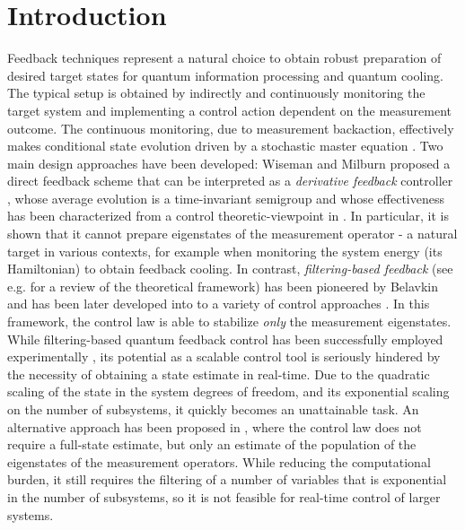 \documentclass[conference]{IEEEtran}
\theoremstyle{plain}
\theoremstyle{plain}
\theoremstyle{plain}
\theoremstyle{plain}
\theoremstyle{remark}
\theoremstyle{definition}
\begin{document}
\section{Introduction}
Feedback techniques represent a natural choice to obtain robust preparation of desired target states for quantum information processing and quantum cooling. The typical setup \cite{AltafiniIntroduction2012,wisemanmilburn,barchielli} is obtained by indirectly and continuously monitoring the target system and implementing a control action dependent on the measurement outcome. The continuous monitoring, due to measurement backaction, effectively makes conditional state evolution driven by a stochastic master equation \cite{wisemanmilburn,bouten,pellegrini,barchielli}. Two main design approaches have been developed: Wiseman and Milburn \cite{wiseman-markovfb} proposed a direct feedback scheme that can be interpreted as a {\em derivative feedback} controller \cite{gough-pid}, whose average evolution is a time-invariant semigroup and whose effectiveness has been characterized from a control theoretic-viewpoint in \cite{ticozziAnalysisSynthesisAttractive2009}. In particular, it is shown that it cannot prepare eigenstates of the measurement operator - a natural target in various contexts, for example when monitoring the system energy (its Hamiltonian) to obtain feedback cooling.
In contrast, {\em filtering-based feedback} (see e.g. \cite{bouten,AltafiniIntroduction2012} for a review of the theoretical framework) has been pioneered by Belavkin \cite{belavkin} and has been later developed into to a variety of control approaches \cite{mirrahimi, globstabfeed,destab,expstabqnd,weichaoexp,switching}. In this framework, the control law is able to stabilize {\em only} the measurement eigenstates. While filtering-based quantum feedback control has been successfully employed experimentally \cite{haroche}, its potential as a scalable control tool is seriously hindered by the necessity of obtaining a state estimate in real-time. Due to the quadratic scaling of the state in the system degrees of freedom, and its exponential scaling on the number of subsystems, it quickly becomes an unattainable task. An alternative approach has been proposed in \cite{expstabqnd}, where the control law does not require a full-state estimate, but only an estimate of the population of the eigenstates of the measurement operators. While reducing the computational burden, it still requires the filtering of a number of variables that is exponential in the number of subsystems, so it is not feasible for real-time control of larger systems.
\end{document}
